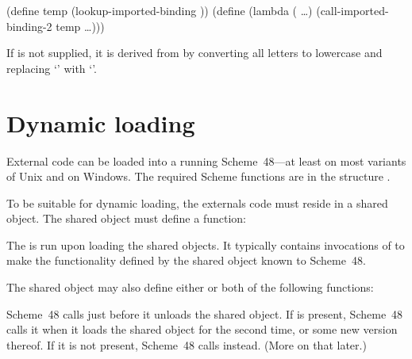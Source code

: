 \begin{example}
(define temp (lookup-imported-binding ))
(define 
  (lambda ( \ldots)
    (call-imported-binding-2 temp  \ldots)))
\end{example}

\noindent{}
If  is not supplied, it is derived from  by converting
 all letters to lowercase and replacing `\code{-}' with `\code{\_}'.

\section{Dynamic loading}
\label{dynamic-externals}

External code can be loaded into a running Scheme~48---at least on
most variants of Unix and on Windows.  The required Scheme functions
are in the structure .

To be suitable for dynamic loading, the externals code must reside in
a shared object.  The shared object must define a function:
%
\begin{protos}
\end{protos}
%
The  is run upon loading the shared objects.  It
typically contains invocations of  to
make the functionality defined by the shared object known to
Scheme~48. 

The shared object may also define either or both of the following
functions:
%
\begin{protos}
\end{protos}
Scheme~48 calls  just before it unloads the
shared object.  If  is present, Scheme~48 calls
it when it loads the shared object for the second time, or some new
version thereof.  If it is not present, Scheme~48 calls
 instead.  (More on that later.)

